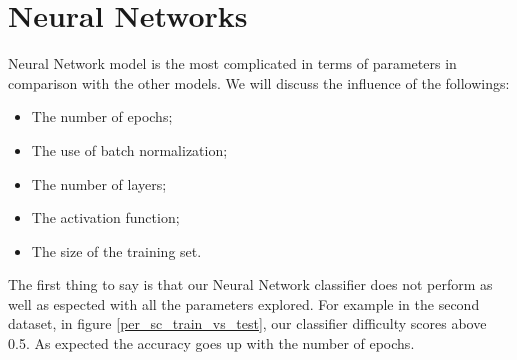 \documentclass[10pt]{article}
\begin{document}
	\section{Neural Networks}
		Neural Network model is the most complicated in terms of parameters in comparison with the other models. We will discuss the influence of the followings:
		\begin{itemize}
			\item The number of epochs;
			\item The use of batch normalization;
			\item The number of layers;
			\item The activation function;
			\item The size of the training set.
		\end{itemize}

		The first thing to say is that our Neural Network classifier does not perform as well as espected with all the parameters explored. For example in the second dataset, in figure \ref{per_sc_train_vs_test}, our classifier difficulty scores above 0.5. As expected the accuracy goes up with the number of epochs.
\end{document}
